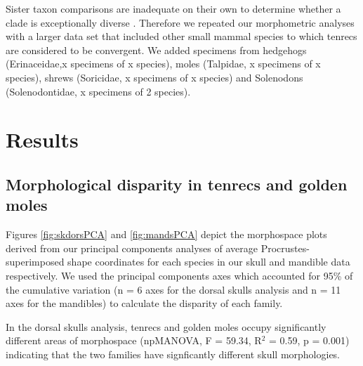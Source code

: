 \documentclass[12pt,a4paper]{article}
\begin{document}
	Sister taxon comparisons are inadequate on their own to determine whether a clade is exceptionally diverse \citep{Losos2002}. Therefore we repeated our morphometric analyses with a larger data set that included other small mammal species to which tenrecs are considered to be convergent. We added specimens from hedgehogs (Erinaceidae,x specimens of x species), moles (Talpidae, x specimens of x species), shrews (Soricidae, x specimens of x species) and Solenodons (Solenodontidae, x specimens of 2 species).







\section{Results}

\subsection{Morphological disparity in tenrecs and golden moles} 
 
	Figures  \ref{fig:skdorsPCA} and \ref{fig:mandsPCA} 
	depict the morphospace plots derived from our principal components analyses of average Procrustes-superimposed shape coordinates for each species in our skull and mandible data respectively. We used the principal components axes which accounted for 95\% of the cumulative variation (n = 6 axes for the dorsal skulls analysis and n = 11 axes for the mandibles) to calculate the disparity of each family. 

	In the dorsal skulls analysis, tenrecs and golden moles occupy significantly different areas of morphospace (npMANOVA, F = 59.34, R$^2 $ = 0.59, p = 0.001) indicating that the two families have signficantly different skull morphologies. 
\end{document}
